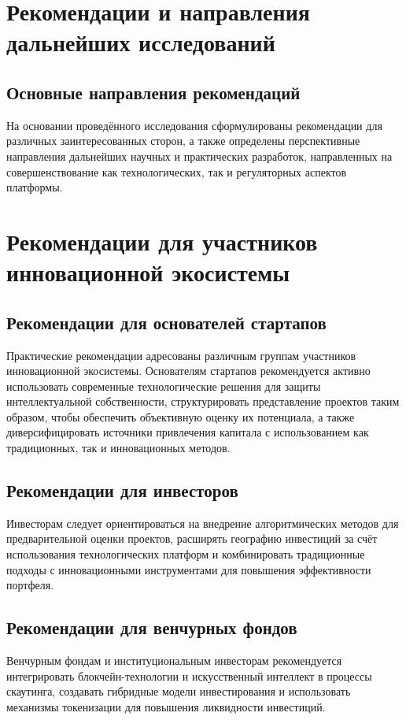 \documentclass[
    candidate, %
    subf, %
    dotsinheaders=false,
]{disser}
\begin{document}
\section{Рекомендации и направления дальнейших исследований}

\subsection{Основные направления рекомендаций}
На основании проведённого исследования сформулированы рекомендации для различных заинтересованных сторон, а также определены перспективные направления дальнейших научных и практических разработок, направленных на совершенствование как технологических, так и регуляторных аспектов платформы.

\section{Рекомендации для участников инновационной экосистемы}

\subsection{Рекомендации для основателей стартапов}
Практические рекомендации адресованы различным группам участников инновационной экосистемы. Основателям стартапов рекомендуется активно использовать современные технологические решения для защиты интеллектуальной собственности, структурировать представление проектов таким образом, чтобы обеспечить объективную оценку их потенциала, а также диверсифицировать источники привлечения капитала с использованием как традиционных, так и инновационных методов.

\subsection{Рекомендации для инвесторов}
Инвесторам следует ориентироваться на внедрение алгоритмических методов для предварительной оценки проектов, расширять географию инвестиций за счёт использования технологических платформ и комбинировать традиционные подходы с инновационными инструментами для повышения эффективности портфеля.

\subsection{Рекомендации для венчурных фондов}
Венчурным фондам и институциональным инвесторам рекомендуется интегрировать блокчейн-технологии и искусственный интеллект в процессы скаутинга, создавать гибридные модели инвестирования и использовать механизмы токенизации для повышения ликвидности инвестиций.
\end{document}
